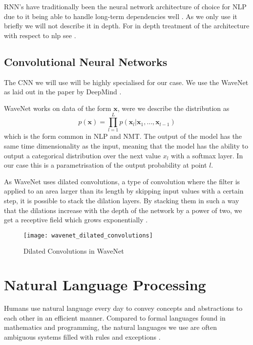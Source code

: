 RNN's have traditionally been the neural network architecture of choice for NLP
due to it being able to handle long-term dependencies well \cite{KarpathyRNN}. As we only use it
briefly we will not describe it in depth. For in depth treatment of the
architecture with respect to nlp see \cite{Hochreiter:1997:LSM:1246443.1246450, sundermeyer2012lstm}.

\subsection{Convolutional Neural Networks}

The CNN we will use will be highly specialised for our case. We use the WaveNet
as laid out in the paper by DeepMind \cite{DBLP:journals/corr/OordDZSVGKSK16}.

WaveNet works on data of the form $\bm{x}$, were we describe the distribution as
\begin{equation*}
p(\bm{x}) = \prod_{l=1}^L p(\bm{x}_l| \bm{x}_1, \dots, \bm{x}_{l-1})
\end{equation*}
which is the form common in NLP and NMT. The output of the model has the same
time dimensionality as the input, meaning that the model has the ability to
output a categorical distribution over the next value $x_l$ with a softmax
layer. In our case this is a parametrisation of the output probability at point
$l$.

As WaveNet uses dilated convolutions, a type of convolution where the filter is applied
to an area larger than its length by skipping input values with a certain step,
it is possible to stack the dilation layers. By stacking them in such a way that
the dilations increase with the depth of the network by a power of two, we get a
receptive field which grows exponentially \cite{DBLP:journals/corr/OordDZSVGKSK16}.

\begin{figure}[H]
  \centering
  \texttt{[image: wavenet\_dilated\_convolutions]}
  \caption{Dilated Convolutions in WaveNet \cite{DBLP:journals/corr/OordDZSVGKSK16}}
  \label{fig:wavenet_dilated_convolutions}
\end{figure}

\section{Natural Language Processing}

Humans use natural language every day to convey concepts and abstractions to each
other in an efficient manner. Compared to formal languages found in
mathematics and programming, the natural languages we use are often
ambiguous systems filled with rules and exceptions \cite{Rosenfeld00twodecades, sep-computational-linguistics}.


